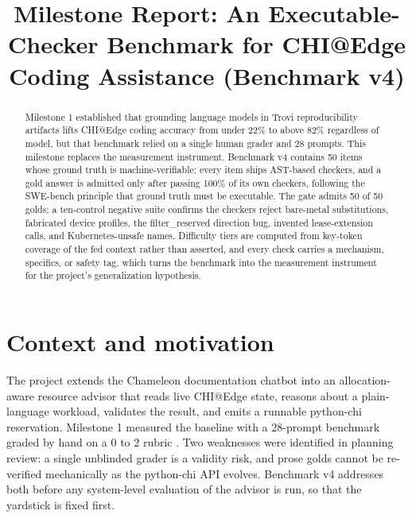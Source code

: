 \documentclass[conference]{IEEEtran}
\begin{document}
\title{Milestone Report: An Executable-Checker Benchmark for CHI@Edge Coding Assistance (Benchmark v4)}

\author{
}

\maketitle

\begin{abstract}
Milestone 1 established that grounding language models in Trovi reproducibility
artifacts lifts CHI@Edge coding accuracy from under 22\% to above 82\%
regardless of model, but that benchmark relied on a single human grader and 28
prompts. This milestone replaces the measurement instrument. Benchmark v4
contains 50 items whose ground truth is machine-verifiable: every item ships
AST-based checkers, and a gold answer is admitted only after passing 100\% of
its own checkers, following the SWE-bench principle that ground truth must be
executable. The gate admits 50 of 50 golds; a ten-control negative suite
confirms the checkers reject bare-metal substitutions, fabricated device
profiles, the filter\_reserved direction bug, invented lease-extension calls,
and Kubernetes-unsafe names. Difficulty tiers are computed from key-token
coverage of the fed context rather than asserted, and every check carries a
mechanism, specifics, or safety tag, which turns the benchmark into the
measurement instrument for the project's generalization hypothesis.
\end{abstract}

\section{Context and motivation}
The project extends the Chameleon documentation chatbot into an
allocation-aware resource advisor that reads live CHI@Edge state, reasons about
a plain-language workload, validates the result, and emits a runnable
python-chi reservation. Milestone 1 measured the baseline with a 28-prompt
benchmark graded by hand on a 0 to 2 rubric \cite{m1}. Two weaknesses were
identified in planning review: a single unblinded grader is a validity risk,
and prose golds cannot be re-verified mechanically as the python-chi API
evolves. Benchmark v4 addresses both before any system-level evaluation of the
advisor is run, so that the yardstick is fixed first.
\end{document}
